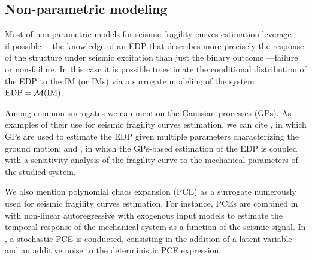 















\subsection{Non-parametric modeling}\label{sec:intro-frags:subsec-nonparametric}


Most of non-parametric models for seismic fragility curves estimation leverage ---if possible--- the knowledge of an EDP that describes more precisely the response of the structure under seismic excitation than just the binary outcome ---failure or non-failure.
In this case it is possible to estimate the conditional distribution of the EDP to the IM (or IMs) via a surrogate modeling of the system $\text{EDP}=\mathcal{M}(\text{IM})$.

Among common surrogates we can mention the Gaussian processes (GPs). As examples of their use for seismic fragility curves estimation, we can cite \cite{gidaris_kriging_2015}, in which GPs are used to estimate the EDP given multiple parameters characterizing the ground motion; and \cite{gauchy_uncertainty_2024}, in which the GPs-based estimation of the EDP is coupled with a sensitivity analysis of the fragility curve to the mechanical parameters of the studied system.

We also mention polynomial chaos expansion (PCE) as a surrogate numerously used for seismic fragility curves estimation. For instance, PCEs are combined in \cite{mai_surrogate_2016} with non-linear autoregressive with exogenous input models to estimate the temporal response of the mechanical system as a function of the seismic signal.
In \cite{zhu_seismic_2023}, a stochastic PCE is conducted, consisting in the addition of a latent variable and an additive noise to the deterministic PCE expression.

